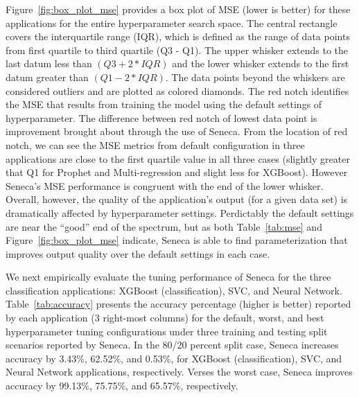 Figure~\ref{fig:box_plot_mse} provides a box plot of MSE (lower is better) for
these applications for the entire hyperparameter search space. The central
rectangle covers the interquartile range (IQR), which is defined as the range
of data points from first quartile to third quartile (Q3 - Q1).  The upper
whisker extends to the last datum less than \texttt{$(Q3 + 2 * IQR)$} and the
lower whisker extends to the first datum greater than \texttt{$(Q1 - 2 *
IQR)$}. The data points beyond the whiskers are considered outliers and are
plotted as colored diamonds. The red notch identifies the MSE that results
from training the model using the default settings of hyperparameter. The
difference between red notch of lowest data point is improvement brought about
through the use of Seneca. From the location of red notch, we can see the MSE
metrics from default configuration in three applications are close to the
first quartile value in all three cases (slightly greater that Q1 for Prophet
and Multi-regression and slight less for XGBoost).  However Seneca's MSE
performance is congruent with the end of the lower whisker.  Overall, however,
the quality of the application's output (for a given data set) is dramatically
affected by hyperparameter settings.  Perdictably the default settings are
near the ``good'' end of the spectrum, but as both Table~\ref{tab:mse} and
Figure~\ref{fig:box_plot_mse} indicate, Seneca is able to find
parameterization that improves output quality over the default settings
in each case.

We next empirically evaluate the tuning performance of Seneca for the three
classification applications: XGBoost (classification), SVC, and Neural
Network.  Table~\ref{tab:accuracy} presents the accuracy percentage (higher is
better) reported by each application (3 right-most columns) for the default,
worst, and best hyperparameter tuning configurations under three training and
testing split scenarios reported by Seneca.  In the 80/20 percent split case,
Seneca increases accuracy by 3.43\%, 62.52\%, and 0.53\%, for XGBoost
(classification), SVC, and Neural Network applications, respectively.  Verses
the worst case, Seneca improves accuracy by 99.13\%, 75.75\%, and 65.57\%,
respectively.


